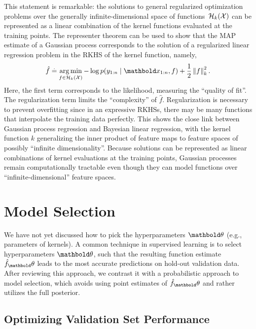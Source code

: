 This statement is remarkable: the solutions to general regularized optimization problems over the generally infinite-dimensional space of functions~$\mathcal{H}_k(\mathcal{X})$ can be represented as a linear combination of the kernel functions evaluated at the training points.
The representer theorem can be used to show that the MAP estimate of a Gaussian process corresponds to the solution of a regularized linear regression problem in the RKHS of the kernel function, namely,  \begin{align}
  \hat{f} \defeq \argmin_{f \in \spH_k(\spX)} - \log p(y_{1:n} \mid \vx_{1:n}, f) + \frac{1}{2} \norm{f}_k^2. \label{eq:map_of_gp}
\end{align}
Here, the first term corresponds to the likelihood, measuring the ``quality of fit''.
The regularization term limits the ``complexity'' of $\hat{f}$.
Regularization is necessary to prevent overfitting since in an expressive RKHSs, there may be many functions that interpolate the training data perfectly.
This shows the close link between Gaussian process regression and Bayesian linear regression, with the kernel function $k$ generalizing the inner product of feature maps to feature spaces of possibly ``infinite dimensionality''.
Because solutions can be represented as linear combinations of kernel evaluations at the training points, Gaussian processes remain computationally tractable even though they can model functions over ``infinite-dimensional'' feature spaces.

\section{Model Selection}\label{sec:gp:model_selection}

We have not yet discussed how to pick the hyperparameters $\vtheta$ (e.g., parameters of kernels).
A common technique in supervised learning is to select hyperparameters $\vtheta$, such that the resulting function estimate $\hat{f}_\vtheta$ leads to the most accurate predictions on hold-out validation data.
After reviewing this approach, we contrast it with a probabilistic approach to model selection, which avoids using point estimates of $\hat{f}_\vtheta$ and rather utilizes the full posterior.

\subsection{Optimizing Validation Set Performance}

